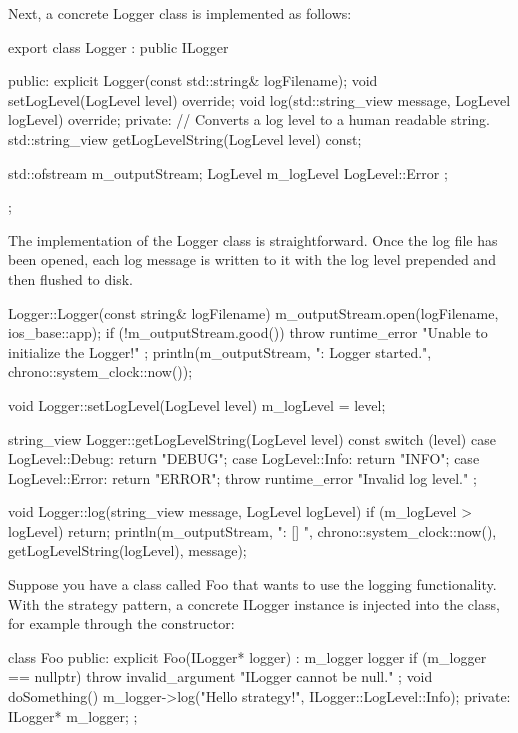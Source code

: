 Next, a concrete Logger class is implemented as follows:

\begin{cpp}
export class Logger : public ILogger
{
    public:
        explicit Logger(const std::string& logFilename);
        void setLogLevel(LogLevel level) override;
        void log(std::string_view message, LogLevel logLevel) override;
    private:
        // Converts a log level to a human readable string.
        std::string_view getLogLevelString(LogLevel level) const;

        std::ofstream m_outputStream;
        LogLevel m_logLevel { LogLevel::Error };
};
\end{cpp}

The implementation of the Logger class is straightforward. Once the log file has been opened, each log message is written to it with the log level prepended and then flushed to disk.

\begin{cpp}
Logger::Logger(const string& logFilename)
{
    m_outputStream.open(logFilename, ios_base::app);
    if (!m_outputStream.good()) {
        throw runtime_error { "Unable to initialize the Logger!" };
    }
    println(m_outputStream, "{}: Logger started.", chrono::system_clock::now());
}

void Logger::setLogLevel(LogLevel level)
{
    m_logLevel = level;
}

string_view Logger::getLogLevelString(LogLevel level) const
{
    switch (level) {
        case LogLevel::Debug: return "DEBUG";
        case LogLevel::Info: return "INFO";
        case LogLevel::Error: return "ERROR";
    }
    throw runtime_error { "Invalid log level." };
}

void Logger::log(string_view message, LogLevel logLevel)
{
    if (m_logLevel > logLevel) { return; }
    println(m_outputStream, "{}: [{}] {}", chrono::system_clock::now(),
        getLogLevelString(logLevel), message);
}
\end{cpp}


Suppose you have a class called Foo that wants to use the logging functionality. With the strategy pattern, a concrete ILogger instance is injected into the class, for example through the constructor:

\begin{cpp}
class Foo
{
    public:
        explicit Foo(ILogger* logger) : m_logger { logger }
        {
            if (m_logger == nullptr) {
                throw invalid_argument { "ILogger cannot be null." };
            }
        }
        void doSomething()
        {
            m_logger->log("Hello strategy!", ILogger::LogLevel::Info);
        }
    private:
        ILogger* m_logger;
};
\end{cpp}

